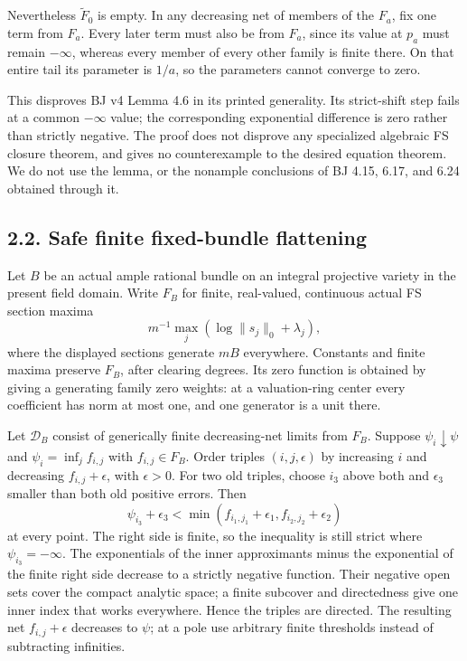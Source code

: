 \documentclass[
  10pt,
]{article}
\begin{document}
Nevertheless \(\widetilde F_0\) is empty. In any decreasing net of
members of the \(F_a\), fix one term from \(F_a\). Every later term must
also be from \(F_a\), since its value at \(p_a\) must remain
\(-\infty\), whereas every member of every other family is finite there.
On that entire tail its parameter is \(1/a\), so the parameters cannot
converge to zero.

This disproves BJ v4 Lemma 4.6 in its printed generality. Its
strict-shift step fails at a common \(-\infty\) value; the corresponding
exponential difference is zero rather than strictly negative. The proof
does not disprove any specialized algebraic FS closure theorem, and
gives no counterexample to the desired equation theorem. We do not use
the lemma, or the nonample conclusions of BJ 4.15, 6.17, and 6.24
obtained through it.

\subsection{2.2. Safe finite fixed-bundle
flattening}\label{safe-finite-fixed-bundle-flattening}

Let \(B\) be an actual ample rational bundle on an integral projective
variety in the present field domain. Write \(F_B\) for finite,
real-valued, continuous actual FS section maxima \[
m^{-1}\max_j(\log\|s_j\|_0+\lambda_j),
\] where the displayed sections generate \(mB\) everywhere. Constants
and finite maxima preserve \(F_B\), after clearing degrees. Its zero
function is obtained by giving a generating family zero weights: at a
valuation-ring center every coefficient has norm at most one, and one
generator is a unit there.

Let \(\mathcal D_B\) consist of generically finite decreasing-net limits
from \(F_B\). Suppose \(\psi_i\downarrow\psi\) and
\(\psi_i=\inf_j f_{i,j}\) with \(f_{i,j}\in F_B\). Order triples
\((i,j,\epsilon)\) by increasing \(i\) and decreasing
\(f_{i,j}+\epsilon\), with \(\epsilon>0\). For two old triples, choose
\(i_3\) above both and \(\epsilon_3\) smaller than both old positive
errors. Then \[
\psi_{i_3}+\epsilon_3<
\min(f_{i_1,j_1}+\epsilon_1,f_{i_2,j_2}+\epsilon_2)
\] at every point. The right side is finite, so the inequality is still
strict where \(\psi_{i_3}=-\infty\). The exponentials of the inner
approximants minus the exponential of the finite right side decrease to
a strictly negative function. Their negative open sets cover the compact
analytic space; a finite subcover and directedness give one inner index
that works everywhere. Hence the triples are directed. The resulting net
\(f_{i,j}+\epsilon\) decreases to \(\psi\); at a pole use arbitrary
finite thresholds instead of subtracting infinities.
\end{document}
